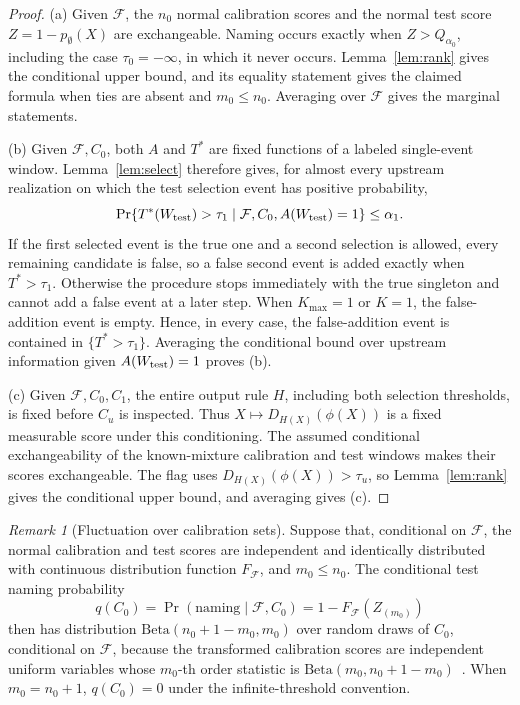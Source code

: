 \documentclass[10pt]{article}
\theoremstyle{plain}
\theoremstyle{remark}
\newtheorem{remark}{Remark}
\begin{document}
\begin{proof}
(a) Given $\mathcal F$, the $n_0$ normal calibration scores and the normal test score $Z=1-p_\emptyset(X)$ are exchangeable. Naming occurs exactly when $Z>Q_{\alpha_0}$, including the case $\tau_0=-\infty$, in which it never occurs. Lemma~\ref{lem:rank} gives the conditional upper bound, and its equality statement gives the claimed formula when ties are absent and $m_0\le n_0$. Averaging over $\mathcal F$ gives the marginal statements.

(b) Given $\mathcal F,C_0$, both $A$ and $T^*$ are fixed functions of a labeled single-event window. Lemma~\ref{lem:select} therefore gives, for almost every upstream realization on which the test selection event has positive probability,
\[
 \Pr\{T^*(W_{\rm test})>\tau_1\mid\mathcal F,C_0,A(W_{\rm test})=1\}\le\alpha_1.
\]
If the first selected event is the true one and a second selection is allowed, every remaining candidate is false, so a false second event is added exactly when $T^*>\tau_1$. Otherwise the procedure stops immediately with the true singleton and cannot add a false event at a later step. When $K_{\max}=1$ or $K=1$, the false-addition event is empty. Hence, in every case, the false-addition event is contained in $\{T^*>\tau_1\}$. Averaging the conditional bound over upstream information given $A(W_{\rm test})=1$ proves (b).

(c) Given $\mathcal F,C_0,C_1$, the entire output rule $H$, including both selection thresholds, is fixed before $C_u$ is inspected. Thus $X\mapsto D_{H(X)}(\phi(X))$ is a fixed measurable score under this conditioning. The assumed conditional exchangeability of the known-mixture calibration and test windows makes their scores exchangeable. The flag uses $D_{H(X)}(\phi(X))>\tau_u$, so Lemma~\ref{lem:rank} gives the conditional upper bound, and averaging gives (c).
\end{proof}

\begin{remark}[Fluctuation over calibration sets]

Suppose that, conditional on $\mathcal F$, the normal calibration and test scores are independent and identically distributed with continuous distribution function $F_{\mathcal F}$, and $m_0\le n_0$. The conditional test naming probability
\[
 q(C_0)=\Pr(\text{naming}\mid\mathcal F,C_0)
       =1-F_{\mathcal F}(Z_{(m_0)})
\]
then has distribution $\mathrm{Beta}(n_0+1-m_0,m_0)$ over random draws of $C_0$, conditional on $\mathcal F$, because the transformed calibration scores are independent uniform variables whose $m_0$-th order statistic is $\mathrm{Beta}(m_0,n_0+1-m_0)$~\cite{Vovk2005Algorithmic,Lei2018Distribution}. When $m_0=n_0+1$, $q(C_0)=0$ under the infinite-threshold convention.

\end{remark}
\end{document}
